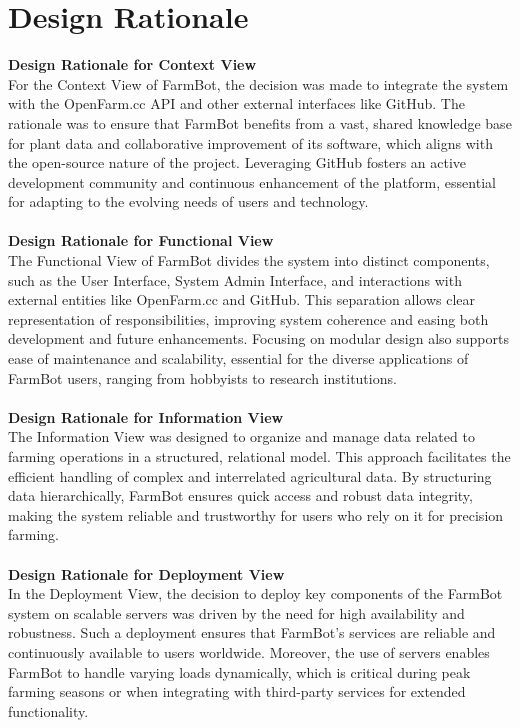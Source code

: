 \newpage
\section{Design Rationale}
\textbf{Design Rationale for Context View}\\
For the Context View of FarmBot, the decision was made to integrate the system with the OpenFarm.cc API and other external interfaces like GitHub. The rationale was to ensure that FarmBot benefits from a vast, shared knowledge base for plant data and collaborative improvement of its software, which aligns with the open-source nature of the project. Leveraging GitHub fosters an active development community and continuous enhancement of the platform, essential for adapting to the evolving needs of users and technology.\\\\
\textbf{Design Rationale for Functional View}\\
The Functional View of FarmBot divides the system into distinct components, such as the User Interface, System Admin Interface, and interactions with external entities like OpenFarm.cc and GitHub. This separation allows clear representation of responsibilities, improving system coherence and easing both development and future enhancements. Focusing on modular design also supports ease of maintenance and scalability, essential for the diverse applications of FarmBot users, ranging from hobbyists to research institutions.\\\\
\textbf{Design Rationale for Information View}\\
The Information View was designed to organize and manage data related to farming operations in a structured, relational model. This approach facilitates the efficient handling of complex and interrelated agricultural data. By structuring data hierarchically, FarmBot ensures quick access and robust data integrity, making the system reliable and trustworthy for users who rely on it for precision farming.\\\\
\textbf{Design Rationale for Deployment View}\\
In the Deployment View, the decision to deploy key components of the FarmBot system on scalable servers was driven by the need for high availability and robustness. Such a deployment ensures that FarmBot's services are reliable and continuously available to users worldwide. Moreover, the use of servers enables FarmBot to handle varying loads dynamically, which is critical during peak farming seasons or when integrating with third-party services for extended functionality.